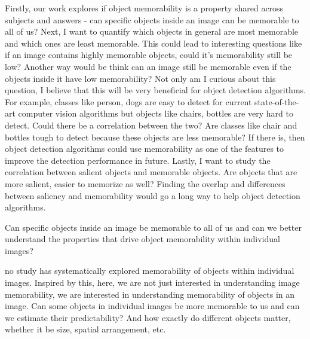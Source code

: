 Firstly, our work explores if object memorability is a property shared across subjects and answers - can specific objects inside an image can be memorable to all of us? Next, I want to quantify which objects in general are most memorable and which ones are least memorable. This could lead to interesting questions like if an image contains highly memorable objects, could it's memorability still be low? Another way would be think can an image still be memorable even if the objects inside it have low memorability? Not only am I curious about this question, I believe that this will be very beneficial for object detection algorithms. For example, classes like person, dogs are easy to detect for current state-of-the-art computer vision algorithms but objects like chairs, bottles are very hard to detect. Could there be a correlation between the two? Are classes like chair and bottles tough to detect because these objects are less memorable? If there is, then object detection algorithms could use memorability as one of the features to improve the detection performance in future. Lastly, I want to study the correlation between salient objects and memorable objects. Are objects that are more salient, easier to memorize as well? Finding the overlap and differences between saliency and memorability would go a long way to help object detection algorithms.

Can specific objects inside an image be memorable to all of us and can we better understand the properties that drive object memorability within individual images?




 no study has systematically explored memorability of objects within individual images. Inspired by this, here, we are not just interested in understanding image memorability, we are interested in understanding memorability of objects in an image. Can some objects in individual images be more memorable to us and can we estimate their predictability?  And how exactly do different objects matter, whether it be size, spatial arrangement, etc.

%
%

